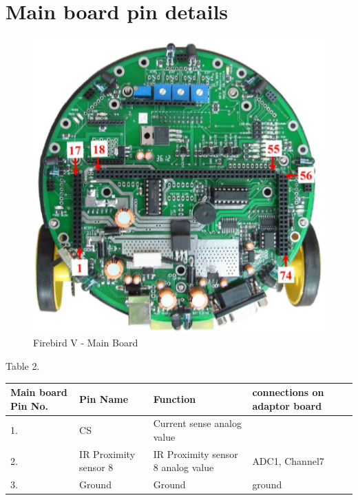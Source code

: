 \documentclass[a4paper,12pt,oneside]{book}
\begin{document}
\section{\textbf{Main board pin details}}
\begin{figure}[h]
	\includegraphics[width=1.\textwidth]{main_board}
	\caption{Firebird V - Main Board}
\end{figure}
\hspace{7cm}Table 2.\\
\begin{tabular}{|p{2cm}|p{3cm}|p{6cm}|p{5cm}|}
	
	\hline
\textbf{Main board Pin No.} & \textbf{Pin Name} & \textbf{Function} & connections on adaptor board\\ [0.5ex] 
\hline
1. & CS\* &Current sense analog value &  \\ 
\hline
2. & IR Proximity sensor 8 &IR Proximity sensor 8 analog value & ADC1, Channel7 \\ 
\hline
3. &Ground &Ground & ground \\ 
\hline
\end{tabular}
\end{document}
